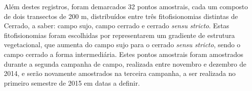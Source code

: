 Além destes registros, foram demarcados 32 pontos amostrais, cada um composto de dois transectos de 200 m, distribuídos entre três fitofisionomias distintas de Cerrado, a saber: campo sujo, campo cerrado e cerrado \textit{sensu stricto}. Estas fitofisionomias foram escolhidas por representarem um gradiente de estrutura vegetacional, que aumenta do campo sujo para o cerrado \textit{sensu stricto}, sendo o campo cerrado a forma intermediária. Estes pontos amostrais foram amostrados durante a segunda campanha de campo, realizada entre novembro e dezembro de 2014, e serão novamente amostrados na terceira campanha, a ser realizada no primeiro semestre de 2015 em datas a definir.




